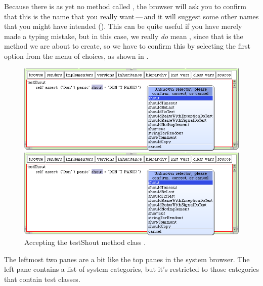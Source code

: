 \documentclass[a4paper,10pt,twoside]{book}
\begin{document}
Because there is as yet no method called , the browser will ask you to confirm that this is the name that you really want\,---\,and it will suggest some other names that you might have intended ().
This can be quite useful if you have merely made a typing mistake, but in this case, we really \emph{do} mean , since that is the method we are about to create, so we have to confirm this by selecting the first option from the menu of choices, as shown in . 

\begin{figure}[hbt]
\ifluluelse
	{\centerline {\includegraphics[width=\textwidth]{testShoutConfirm}}}
	{\centerline {\includegraphics[scale=0.7]{testShoutConfirm}}}
\caption{Accepting the testShout method class .
\label{fig:testShoutConfirm}}
\end{figure}


The leftmost two panes are a bit like the top panes in the system browser.  The left pane contains a list of system categories, but it's restricted to those categories that contain test classes.

\end{document}
